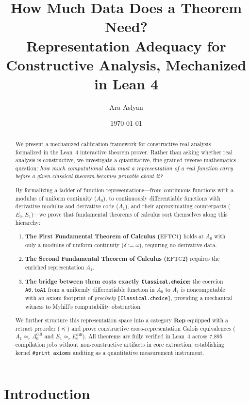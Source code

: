 \documentclass[11pt,a4paper]{article}
\title{\textbf{How Much Data Does a Theorem Need?\\Representation Adequacy for Constructive Analysis, Mechanized in Lean 4}}
\author{Ara Aslyan}
\date{\today}
\theoremstyle{definition}
\theoremstyle{remark}
\newcommand{\Rep}{\ensuremath{\mathbf{Rep}}}
\newcommand{\simeqR}{\ensuremath{\simeq_r}}
\begin{document}
\maketitle

\begin{abstract}
We present a mechanized calibration framework for constructive real analysis formalized in the Lean~4 interactive theorem prover. Rather than asking whether real analysis is constructive, we investigate a quantitative, fine-grained reverse-mathematics question: \emph{how much computational data must a representation of a real function carry before a given classical theorem becomes provable about it?}

By formalizing a ladder of function representations---from continuous functions with a modulus of uniform continuity ($A_0$), to continuously differentiable functions with derivative modulus and derivative code ($A_1$), and their approximating counterparts ($E_0, E_1$)---we prove that fundamental theorems of calculus sort themselves along this hierarchy:
\begin{enumerate}
    \item \textbf{The First Fundamental Theorem of Calculus ($\text{EFTC1}$)} holds at $A_0$ with only a modulus of uniform continuity ($\delta := \omega$), requiring no derivative data.
    \item \textbf{The Second Fundamental Theorem of Calculus ($\text{EFTC2}$)} requires the enriched representation $A_1$.
    \item \textbf{The bridge between them costs exactly \texttt{Classical.choice}:} the coercion \texttt{A0.toA1} from a uniformly differentiable function in $A_0$ to $A_1$ is noncomputable with an axiom footprint of \emph{precisely} \texttt{[Classical.choice]}, providing a mechanical witness to Myhill's computability obstruction.
\end{enumerate}
We further structure this representation space into a category $\Rep$ equipped with a retract preorder ($\preceq$) and prove constructive cross-representation Galois equivalences ($A_1 \simeqR A_0^{\text{diff}}$ and $E_1 \simeqR E_0^{\text{diff}}$). All theorems are fully verified in Lean~4 across 7,895 compilation jobs without non-constructive artifacts in core extraction, establishing kernel \texttt{\#print axioms} auditing as a quantitative measurement instrument.
\end{abstract}

\section{Introduction}
\end{document}
